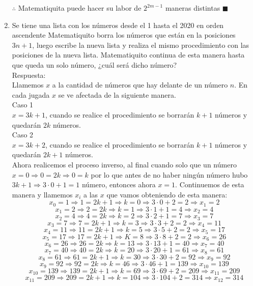 \documentclass{book}
\begin{document}
\begin{enumerate}
			$\therefore$ Matematiquita puede hacer su labor de $2^{2m-1}$ maneras distintas $\blacksquare$\\
			\item Se tiene una lista con los números desde el 1 hasta el 2020 en orden ascendente Matematiquito borra los números que están en la posiciones $3n+1$, luego escribe la nueva lista y realiza el mismo procedimiento con las posiciones de la nueva lista. Matematiquito continua de esta manera hasta que queda un solo número, ¿cuál será dicho número?\\
			Respuesta:\\
			Llamemos $x$ a la cantidad de números que hay delante de un número $n$. En cada jugada $x$ se ve afectada de la siguiente manera.\\
			Caso 1\\
			$x=3k+1$, cuando se realice el procedimiento se borrarán $k+1$ números y quedarán $2k$ números.\\
			Caso 2\\
			$x=3k+2$, cuando se realice el procedimiento se borrarán $k+1$ números y quedarán $2k+1$ números.\\
			Ahora realicemos el proceso inverso, al final cuando solo que un número $x=0\Rightarrow 0=2k\Rightarrow 0=k$ por lo que antes de no haber ningún número hubo $3k+1\Rightarrow 3\cdot 0+1=1$ número, entonces ahora $x=1$. Continuemos de esta manera y llamemos $x_i$ a las $x$ que vamos obteniendo de esta manera:
			$$x_0=1\Rightarrow 1=2k+1\Rightarrow k=0\Rightarrow 3\cdot 0+2=2\Rightarrow x_1=2$$
			$$x_1=2\Rightarrow 2=2k\Rightarrow k=1\Rightarrow 3\cdot 1+1=4\Rightarrow x_2=4$$
			$$x_2=4\Rightarrow 4=2k\Rightarrow k=2\Rightarrow 3\cdot 2+1=7\Rightarrow x_3=7$$
			$$x_3=7\Rightarrow 7=2k+1\Rightarrow k=3\Rightarrow 3\cdot 3+2=2\Rightarrow x_4=11$$
			$$x_4=11\Rightarrow 11=2k+1\Rightarrow k=5\Rightarrow 3\cdot 5+2=2\Rightarrow x_5=17$$
			$$x_5=17\Rightarrow 17=2k+1\Rightarrow K=8\Rightarrow 3\cdot 8+2=2\Rightarrow x_6=26$$
			$$x_6=26\Rightarrow 26=2k\Rightarrow k=13\Rightarrow 3\cdot 13+1=40\Rightarrow x_7=40$$
			$$x_7=40\Rightarrow 40=2k\Rightarrow k=20\Rightarrow 3\cdot 20+1=61\Rightarrow x_8=61$$
			$$x_8=61\Rightarrow 61=2k+1\Rightarrow k=30\Rightarrow 3\cdot 30+2=92\Rightarrow x_9=92$$
			$$x_9=92\Rightarrow 92=2k\Rightarrow k=46\Rightarrow 3\cdot 46+1=139\Rightarrow x_10=139$$
			$$x_{10}=139\Rightarrow 139=2k+1\Rightarrow k=69\Rightarrow 3\cdot 69+2=209\Rightarrow x_{11}=209$$
			$$x_{11}=209\Rightarrow 209=2k+1\Rightarrow k=104\Rightarrow 3\cdot 104+2=314\Rightarrow x_{12}=314$$

\end{enumerate}
\end{document}
